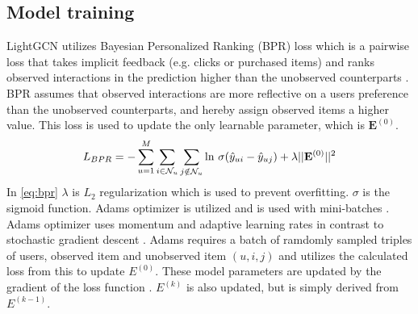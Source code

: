 \subsection{Model training}
LightGCN utilizes Bayesian Personalized Ranking (BPR) loss which is a pairwise loss that takes implicit feedback (e.g. clicks or purchased items) and ranks observed interactions in the prediction higher than the unobserved counterparts \cite{lightgcn,BPR}.
BPR assumes that observed interactions are more reflective on a users preference than the unobserved counterparts, and hereby assign observed items a higher value.
This loss is used to update the only learnable parameter, which is $\mathbf{E}^{(0)}$.
\begin{equation}
    L_{BPR} = - \sum^M_{u=1} \sum_{i \in \mathcal{N}_u} \sum_{j \notin \mathcal{N}_u} \textnormal{ln } \sigma (\hat{y}_{ui} - \hat{y}_{uj}) + \lambda||\mathbf{E}^{(0)}||^2 
    \label{eq:bpr}
\end{equation}
In \autoref{eq:bpr} $\lambda$ is $L_2$ regularization which is used to prevent overfitting. 
$\sigma$ is the sigmoid function.
Adams optimizer is utilized and is used with mini-batches \cite{lightgcn,Adams-optimizer}.
Adams optimizer uses momentum and adaptive learning rates in contrast to stochastic gradient descent \cite{Adams-optimizer}.
Adams requires a batch of ramdomly sampled triples of users, observed item and unobserved item $(u, i, j)$ and utilizes the calculated loss from this to update $E^{(0)}$.
These model parameters are updated by the gradient of the loss function \cite{NGCF_2019,Adams-optimizer}.
$E^{(k)}$ is also updated, but is simply derived from $E^{(k-1)}$.
